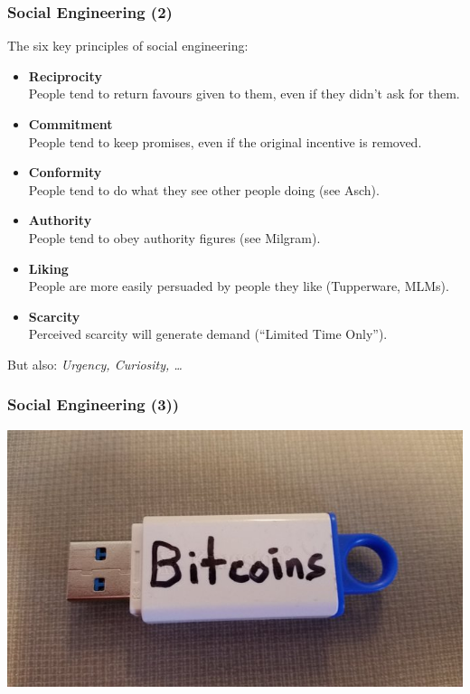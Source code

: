 \documentclass[aspectratio=1610,dvipsnames]{beamer}
\begin{document}
\begin{frame}
\frametitle{Social Engineering (2)}
The six key principles of social engineering:
\bigskip

\begin{minipage}{0.5\textwidth}
\begin{itemize}
\pause\item\textbf{Reciprocity}\\People tend to return favours given to them, even if they didn't ask for them.
\pause\item\textbf{Commitment}\\People tend to keep promises, even if the original incentive is removed.
\pause\item\textbf{Conformity}\\People tend to do what they see other people doing (see Asch).
\end{itemize}
\end{minipage}%
\begin{minipage}{0.5\textwidth}
\begin{itemize}
\pause\item\textbf{Authority}\\People tend to obey authority figures (see Milgram).
\pause\item\textbf{Liking}\\People are more easily persuaded by people they like (Tupperware, MLMs).
\pause\item\textbf{Scarcity}\\Perceived scarcity will generate demand (``Limited Time Only'').
\end{itemize}
\end{minipage}
\bigskip

\begin{center}
But also: \emph{Urgency, Curiosity, \dots}
\end{center}
\end{frame}

\begin{frame}
\frametitle{Social Engineering (3))}
\begin{center}
\includegraphics[scale=0.375]{images/bait} 
\end{center}
\end{frame}
\end{document}

